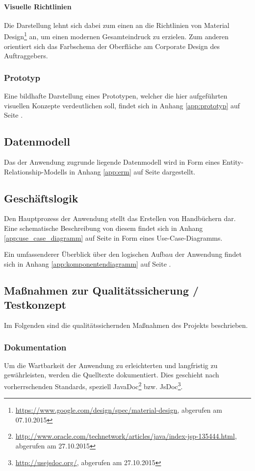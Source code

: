 \documentclass[12pt, xcolor=dvipsnames]{scrartcl}
\begin{document}
\paragraph{Visuelle Richtlinien}

Die Darstellung lehnt sich dabei zum einen an die Richtlinien von
Material Design\footnote{\url{https://www.google.com/design/spec/material-design}, abgerufen am 07.10.2015} an, um einen modernen Gesamteindruck zu erzielen.
Zum anderen orientiert sich das Farbschema der Oberfläche am Corporate Design des Auftraggebers.

\subsubsection{Prototyp}
Eine bildhafte Darstellung eines Prototypen, welcher die hier aufgeführten visuellen Konzepte verdeutlichen soll, findet sich in Anhang \ref{app:prototyp} auf Seite \pageref{app:prototyp}.

\subsection{Datenmodell}
\label{sec:datenmodell}

Das der Anwendung zugrunde liegende Datenmodell wird in Form eines Entity-Relationship-Modells in Anhang \ref{app:erm} auf Seite \pageref{app:erm} dargestellt.

\subsection{Geschäftslogik}

Den Hauptprozess der Anwendung stellt das Erstellen von Handbüchern dar. Eine schematische Beschreibung von diesem findet sich in Anhang \ref{app:use_case_diagramm} auf Seite \pageref{app:use_case_diagramm} in Form eines Use-Case-Diagramms.

Ein umfassenderer Überblick über den logischen Aufbau der Anwendung findet sich in Anhang \ref{app:komponentendiagramm} auf Seite \pageref{app:komponentendiagramm}.

\subsection{Maßnahmen zur Qualitätssicherung / Testkonzept}

Im Folgenden sind die qualitätssichernden Maßnahmen des Projekts beschrieben.

\subsubsection*{Dokumentation} \label{sec:testkonzept:dokumentation}
Um die Wartbarkeit der Anwendung zu erleichterten und langfristig zu gewährleisten, werden die Quelltexte dokumentiert. Dies geschieht nach vorherrschenden Standards, speziell
JavaDoc\footnote{\url{http://www.oracle.com/technetwork/articles/java/index-jsp-135444.html}, abgerufen am 27.10.2015}
bzw.
JsDoc\footnote{\url{http://usejsdoc.org/}, abgerufen am 27.10.2015}.
\end{document}
